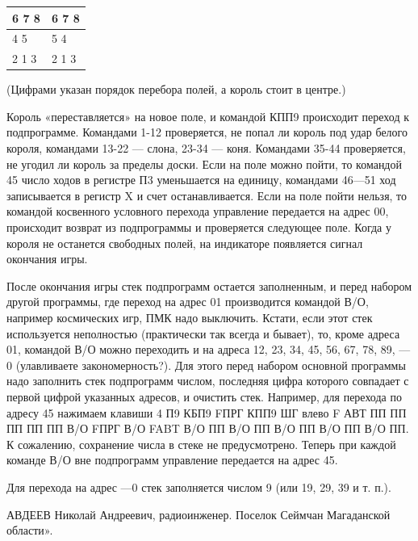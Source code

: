 \documentclass[11pt,a4paper,oneside]{article}
\begin{document}
\begin{table}[H]
\begin{tabular}{|l|l|}
\hline
6 7 8 & 6 7 8 \\ \hline
4 5   & 5 4   \\ \hline
2 1 3 & 2 1 3 \\ \hline
\end{tabular}
\end{table}

(Цифрами указан порядок перебора полей, а король стоит в центре.)

Король «переставляется» на новое поле, и командой КПП9 происходит переход к подпрограмме. Командами 1-12 
проверяется, не попал ли король под удар белого короля, командами 13-22 — слона, 23-34 — коня. Командами 35-44 проверяется, не угодил ли король за пределы доски. Если на поле можно пойти, то командой 45 число ходов в регистре П3 уменьшается на единицу, командами 46—51 ход записывается в регистр X и счет останавливается. Если на поле пойти нельзя, то командой косвенного условного перехода управление передается на адрес 00, происходит возврат из подпрограммы и проверяется следующее поле. Когда у короля не останется свободных полей, на индикаторе появляется сигнал окончания игры.

После окончания игры стек подпрограмм остается заполненным, и перед набором другой программы, где переход на адрес 01 производится командой В/О, например космических игр, ПМК надо выключить. Кстати, если этот стек используется неполностью (практически так всегда и бывает), то, кроме адреса 01, командой В/О можно переходить и на адреса 12, 23, 34, 45, 56, 67, 78, 89, —0 (улавливаете закономерность?). Для этого перед набором основной программы надо заполнить стек подпрограмм числом, последняя цифра которого совпадает с первой цифрой указанных адресов, и очистить стек. Например, для перехода по адресу 45 нажимаем клавиши 4 П9 КБП9 FПРГ КПП9 ШГ влево F АВТ ПП ПП ПП ПП ПП В/О FПРГ В/О FABT В/О ПП В/О ПП В/О ПП В/О ПП В/О ПП. К сожалению, сохранение числа в стеке не предусмотрено. Теперь при каждой команде В/О вне подпрограмм управление передается на адрес 45.

Для перехода на адрес —0 стек заполняется числом 9 (или 19, 29, 39 и т. п.).

АВДЕЕВ Николай Андреевич,
радиоинженер. Поселок Сеймчан Магаданской области».
\end{document}
